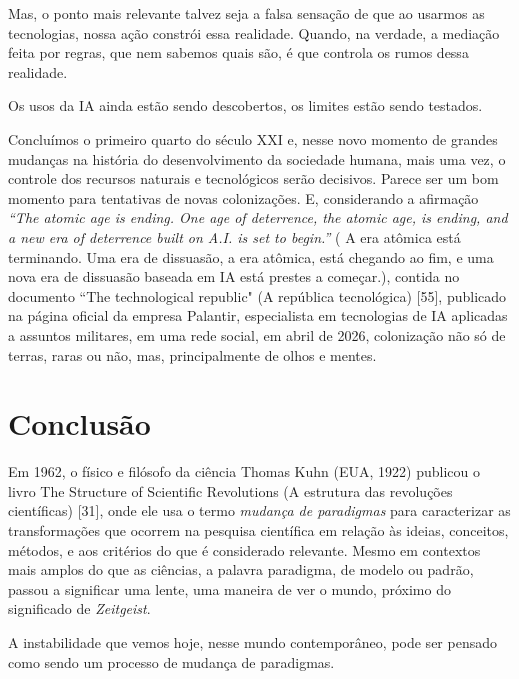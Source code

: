 \documentclass{hipatia}
\begin{document}
Mas, o ponto mais relevante talvez seja a falsa sensação de que ao usarmos as tecnologias, nossa ação constrói essa realidade. Quando, na verdade, a mediação feita por regras, que nem sabemos quais são, é que controla os rumos dessa realidade.

Os usos da IA ainda estão sendo descobertos, os limites estão sendo testados.

Concluímos o primeiro quarto do século XXI e, nesse novo momento de grandes mudanças na história do desenvolvimento da sociedade humana, mais uma vez, o controle dos recursos naturais e tecnológicos serão decisivos. Parece ser um bom momento para tentativas de novas colonizações. E, considerando a afirmação \textit{``The atomic age is ending. One age of deterrence, the atomic age, is ending, and a new era of deterrence built on A.I. is set to begin.''} ( A era atômica está terminando. Uma era de dissuasão, a era atômica, está chegando ao fim, e uma nova era de dissuasão baseada em IA está prestes a começar.), contida no documento ``The technological republic" (A república tecnológica) [55], publicado na página oficial da empresa Palantir, especialista em tecnologias de IA aplicadas a assuntos militares, em uma rede social, em abril de 2026,  colonização não só de terras, raras ou não, mas, principalmente de olhos e mentes.









\section{Conclusão}

Em 1962, o físico e filósofo da ciência Thomas Kuhn (EUA, 1922) publicou o livro The Structure of Scientific Revolutions (A estrutura das revoluções científicas) [31], onde ele usa o termo \textit{mudança de paradigmas} para caracterizar as transformações que ocorrem na pesquisa científica em relação às ideias, conceitos, métodos, e aos critérios do que é considerado relevante. Mesmo em contextos mais amplos do que as ciências, a palavra paradigma, de modelo ou padrão, passou a significar uma lente, uma maneira de ver o mundo, próximo do significado de \textit{Zeitgeist}.

	A instabilidade que vemos hoje, nesse mundo contemporâneo, pode ser pensado como sendo um processo de mudança de paradigmas.
\end{document}
